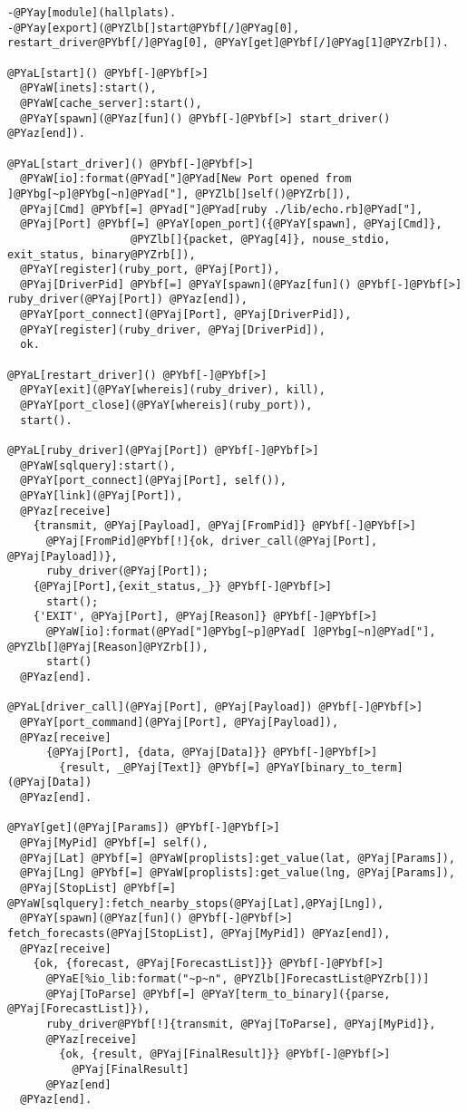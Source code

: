 \begin{Verbatim}[commandchars=@\[\]]
-@PYay[module](hallplats).
-@PYay[export](@PYZlb[]start@PYbf[/]@PYag[0], restart_driver@PYbf[/]@PYag[0], @PYaY[get]@PYbf[/]@PYag[1]@PYZrb[]).

@PYaL[start]() @PYbf[-]@PYbf[>]
  @PYaW[inets]:start(),
  @PYaW[cache_server]:start(),
  @PYaY[spawn](@PYaz[fun]() @PYbf[-]@PYbf[>] start_driver() @PYaz[end]).

@PYaL[start_driver]() @PYbf[-]@PYbf[>]
  @PYaW[io]:format(@PYad["]@PYad[New Port opened from ]@PYbg[~p]@PYbg[~n]@PYad["], @PYZlb[]self()@PYZrb[]),
  @PYaj[Cmd] @PYbf[=] @PYad["]@PYad[ruby ./lib/echo.rb]@PYad["],
  @PYaj[Port] @PYbf[=] @PYaY[open_port]({@PYaY[spawn], @PYaj[Cmd]},
                   @PYZlb[]{packet, @PYag[4]}, nouse_stdio, exit_status, binary@PYZrb[]),
  @PYaY[register](ruby_port, @PYaj[Port]),
  @PYaj[DriverPid] @PYbf[=] @PYaY[spawn](@PYaz[fun]() @PYbf[-]@PYbf[>] ruby_driver(@PYaj[Port]) @PYaz[end]),
  @PYaY[port_connect](@PYaj[Port], @PYaj[DriverPid]),
  @PYaY[register](ruby_driver, @PYaj[DriverPid]),
  ok.
  
@PYaL[restart_driver]() @PYbf[-]@PYbf[>]
  @PYaY[exit](@PYaY[whereis](ruby_driver), kill),
  @PYaY[port_close](@PYaY[whereis](ruby_port)),
  start().

@PYaL[ruby_driver](@PYaj[Port]) @PYbf[-]@PYbf[>]
  @PYaW[sqlquery]:start(),
  @PYaY[port_connect](@PYaj[Port], self()),
  @PYaY[link](@PYaj[Port]),
  @PYaz[receive]
    {transmit, @PYaj[Payload], @PYaj[FromPid]} @PYbf[-]@PYbf[>]
      @PYaj[FromPid]@PYbf[!]{ok, driver_call(@PYaj[Port], @PYaj[Payload])},
      ruby_driver(@PYaj[Port]);
    {@PYaj[Port],{exit_status,_}} @PYbf[-]@PYbf[>]
      start();
    {'EXIT', @PYaj[Port], @PYaj[Reason]} @PYbf[-]@PYbf[>]
      @PYaW[io]:format(@PYad["]@PYbg[~p]@PYad[ ]@PYbg[~n]@PYad["], @PYZlb[]@PYaj[Reason]@PYZrb[]),
      start()
  @PYaz[end].

@PYaL[driver_call](@PYaj[Port], @PYaj[Payload]) @PYbf[-]@PYbf[>]
  @PYaY[port_command](@PYaj[Port], @PYaj[Payload]),
  @PYaz[receive]
      {@PYaj[Port], {data, @PYaj[Data]}} @PYbf[-]@PYbf[>]
        {result, _@PYaj[Text]} @PYbf[=] @PYaY[binary_to_term](@PYaj[Data])
  @PYaz[end].

@PYaY[get](@PYaj[Params]) @PYbf[-]@PYbf[>]
  @PYaj[MyPid] @PYbf[=] self(),
  @PYaj[Lat] @PYbf[=] @PYaW[proplists]:get_value(lat, @PYaj[Params]),
  @PYaj[Lng] @PYbf[=] @PYaW[proplists]:get_value(lng, @PYaj[Params]),
  @PYaj[StopList] @PYbf[=] @PYaW[sqlquery]:fetch_nearby_stops(@PYaj[Lat],@PYaj[Lng]),
  @PYaY[spawn](@PYaz[fun]() @PYbf[-]@PYbf[>] fetch_forecasts(@PYaj[StopList], @PYaj[MyPid]) @PYaz[end]),
  @PYaz[receive]
    {ok, {forecast, @PYaj[ForecastList]}} @PYbf[-]@PYbf[>]
      @PYaE[%io_lib:format("~p~n", @PYZlb[]ForecastList@PYZrb[])]
      @PYaj[ToParse] @PYbf[=] @PYaY[term_to_binary]({parse, @PYaj[ForecastList]}),
      ruby_driver@PYbf[!]{transmit, @PYaj[ToParse], @PYaj[MyPid]},
      @PYaz[receive]
        {ok, {result, @PYaj[FinalResult]}} @PYbf[-]@PYbf[>]
          @PYaj[FinalResult]
      @PYaz[end]
  @PYaz[end].


\end{Verbatim}
